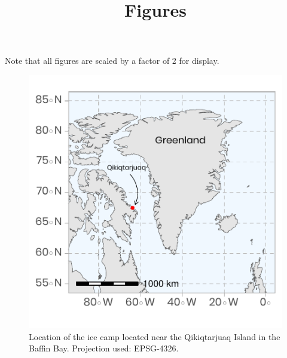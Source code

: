 \documentclass[12pt,a4paper]{scrartcl}
\title{Figures}
\date{}
\begin{document}
\maketitle

Note that all figures are scaled by a factor of 2 for display.

\begin{figure}[h]
	\centering
	\includegraphics[scale = 2]{../../../graphs/fig01.pdf}
	\caption{Location of the ice camp located near the Qikiqtarjuaq Island in the Baffin Bay. Projection used: EPSG-4326.}
\end{figure}

\clearpage
\newpage
\end{document}
